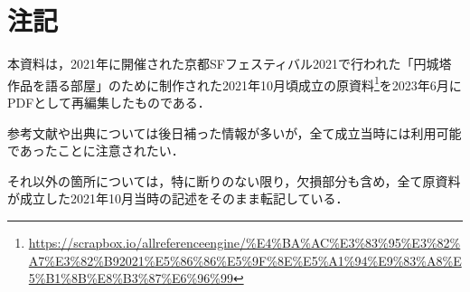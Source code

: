 \documentclass[10pt, a5paper, twoside]{jsarticle}
\begin{document}
	\section*{注記}

		本資料は，2021年に開催された京都SFフェスティバル2021で行われた「円城塔作品を語る部屋」のために制作された2021年10月頃成立の原資料\footnote{\url{https://scrapbox.io/allreferenceengine/%E4%BA%AC%E3%83%95%E3%82%A7%E3%82%B92021%E5%86%86%E5%9F%8E%E5%A1%94%E9%83%A8%E5%B1%8B%E8%B3%87%E6%96%99}}を2023年6月にPDFとして再編集したものである．

		参考文献や出典については後日補った情報が多いが，全て成立当時には利用可能であったことに注意されたい．

		それ以外の箇所については，特に断りのない限り，欠損部分も含め，全て原資料が成立した2021年10月当時の記述をそのまま転記している．
\end{document}
